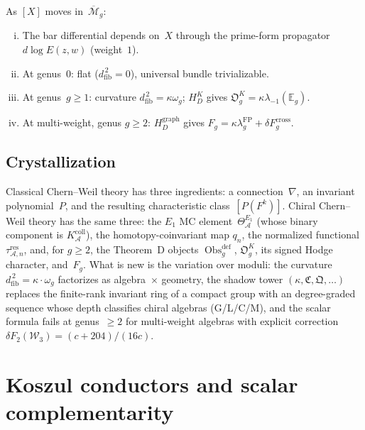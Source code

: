 \documentclass[11pt,reqno]{amsart}
\theoremstyle{definition}
\theoremstyle{remark}
\newcommand{\cA}{\mathcal{A}}
\newcommand{\cW}{\mathcal{W}}
\newcommand{\Mbar}{\overline{\mathcal{M}}}
\newcommand{\Eone}{E_1}
\newcommand{\dfib}{d_{\mathrm{fib}}}
\numberwithin{equation}{section}
\begin{document}
As $[X]$ moves in~$\Mbar_g$:
\begin{enumerate}[(i)]
\item The bar differential depends on~$X$ through the prime-form
 propagator $d\log E(z,w)$ (weight~$1$).
\item At genus~$0$: flat ($\dfib^{\,2} = 0$), universal bundle
 trivializable.
\item At genus~$g \ge 1$: curvature
 $\dfib^{\,2}=\kappa\omega_g$; $H_D^K$ gives
 $\mathfrak O_g^K=\kappa\lambda_{-1}(\mathbb E_g)$.
\item At multi-weight, genus $g \ge 2$: $H_D^{\mathrm{graph}}$ gives
 $F_g=\kappa\lambda_g^{\mathrm{FP}}+\delta F_g^{\mathrm{cross}}$.
\end{enumerate}

\subsection{Crystallization}

Classical Chern--Weil theory has three ingredients: a
connection~$\nabla$, an invariant polynomial~$P$, and the
resulting characteristic class~$[P(F^k)]$. Chiral
Chern--Weil theory has the same three: the $\Eone$ MC
element~$\Theta^{\Eone}_\cA$ (whose binary component is
$K_\cA^{\mathrm{coll}}$), the homotopy-coinvariant map
$q_n$, the normalized functional $\tau_{\cA,n}^{\mathrm{res}}$,
and, for $g\geq2$, the Theorem~D objects
$\operatorname{Obs}^{\mathrm{def}}_g$, $\mathfrak O_g^K$, its signed
Hodge character, and~$F_g$.
What is new is the variation over moduli: the curvature
$\dfib^{\,2} = \kappa\cdot\omega_g$ factorizes as
algebra~$\times$ geometry, the shadow tower
$(\kappa,\mathfrak{C},\mathfrak{Q},\ldots)$ replaces the
finite-rank invariant ring of a compact group with an
degree-graded sequence whose depth classifies chiral algebras
(G/L/C/M), and the scalar formula fails at genus~$\ge 2$ for
multi-weight algebras with explicit correction
$\delta F_2(\cW_3) = (c{+}204)/(16c)$.


\section{Koszul conductors and scalar complementarity}
\label{sec:conductor-scalar}
\end{document}
